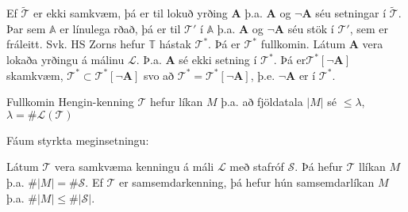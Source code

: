 \documentclass[12pt]{book}
\newcommand{\cT}{\mathcal{T}}
\newcommand{\cL}{\mathcal{L}}
\newcommand{\cS}{\mathcal{S}}
\newcommand{\bA}{\mathbf{A}}
\begin{document}
Ef $\widetilde{\cT}$ er ekki samkvæm, þá er til lokuð yrðing $\bA$ þ.a.
$\bA$ og $\lnot \bA$ séu setningar í $\widetilde{\cT}$. Þar sem $\mathbb{A}$
er línulega rðað, þá er til $\cT'$ í $\mathbb{A}$ þ.a.
$\bA$ og $\lnot \bA$ séu stök í $\cT'$, sem er fráleitt. Svk. HS Zorns hefur $\mathbb{T}$
hástak $\cT^*$. Þá er $\cT^*$ fullkomin. Látum $\bA$ vera lokaða yrðingu á málinu $\cL$.
Þ.a. $\bA$ sé ekki setning í $\cT^*$. Þá er$\cT^*[\lnot \bA]$ skamkvæm,
$\cT^* \subset \cT^*[\lnot \bA]$ svo að $\cT^* = \cT^*[\lnot \bA]$, þ.e.
$\lnot \bA$ er í $\cT^*$.

\begin{setn}
 Fullkomin Hengin-kenning $\cT$ hefur líkan $M$ þ.a. að  fjöldatala
$|M|$ sé $\leq \lambda$, $\lambda = \# \cL(\cT)$
\end{setn}

Fáum styrkta meginsetningu:

\begin{setn}[Meginsetning]
 Látum $\cT$ vera samkvæma kenningu á máli $\cL$ með stafróf
$\cS$. Þá hefur $\cT$ llíkan $M$ þ.a. $\# |M| = \# \cS$. Ef
$\cT$ er samsemdarkenning, þá hefur hún samsemdarlíkan $M$ þ.a.
$\# |M| \leq \# |\cS|$.
\end{setn}
\end{document}
